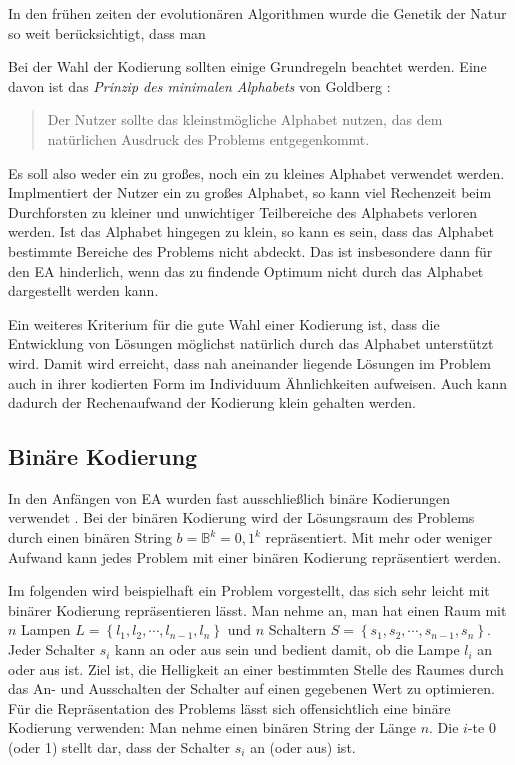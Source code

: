 In den frühen zeiten der evolutionären Algorithmen wurde die Genetik der Natur so weit berücksichtigt, dass man

Bei der Wahl der Kodierung sollten einige Grundregeln beachtet werden. Eine davon ist das \textit{Prinzip des minimalen Alphabets} von Goldberg \cite{Golderg:1}: 

\begin{quote}
Der Nutzer sollte das kleinstmögliche Alphabet nutzen, das dem natürlichen Ausdruck des Problems entgegenkommt.
\end{quote}

Es soll also weder ein zu großes, noch ein zu kleines Alphabet verwendet werden. Implmentiert der Nutzer ein zu großes Alphabet, so kann viel Rechenzeit beim Durchforsten zu kleiner und unwichtiger Teilbereiche des Alphabets verloren werden. Ist das Alphabet hingegen zu klein, so kann es sein, dass das Alphabet bestimmte Bereiche des Problems nicht abdeckt. Das ist insbesondere dann für den EA hinderlich, wenn das zu findende Optimum nicht durch das Alphabet dargestellt werden kann. 

Ein weiteres Kriterium für die gute Wahl einer Kodierung ist, dass die Entwicklung von Lösungen möglichst natürlich durch das Alphabet unterstützt wird. Damit wird erreicht, dass nah aneinander liegende Lösungen im Problem auch in ihrer kodierten Form im Individuum Ähnlichkeiten aufweisen. Auch kann dadurch der Rechenaufwand der Kodierung klein gehalten werden. 

\subsection{Binäre Kodierung}
\label{subsec:binary_coding}
In den Anfängen von EA wurden fast ausschließlich binäre Kodierungen verwendet \cite{Gerdes:1}. 
Bei der binären Kodierung wird der Lösungsraum des Problems durch einen binären String $b = \mathbb{B}^k = {0, 1}^k$ repräsentiert. Mit mehr oder weniger Aufwand kann jedes Problem mit einer binären Kodierung repräsentiert werden. 

Im folgenden wird beispielhaft ein Problem vorgestellt, das sich sehr leicht mit binärer Kodierung repräsentieren lässt. Man nehme an, man hat einen Raum mit $n$ Lampen $L = \left\{l_1, l_2, \cdots , l_{n-1}, l_n\right\}$ und $n$ Schaltern $S = \left\{s_1, s_2, \cdots , s_{n-1}, s_n\right\}$. Jeder Schalter $s_i$ kann an oder aus sein und bedient damit, ob die Lampe $l_i$ an oder aus ist. Ziel ist, die Helligkeit an einer bestimmten Stelle des Raumes durch das An- und Ausschalten der Schalter auf einen gegebenen Wert zu optimieren. Für die Repräsentation des Problems lässt sich offensichtlich eine binäre Kodierung verwenden: Man nehme einen binären String der Länge $n$. Die $i$-te 0 (oder 1) stellt dar, dass der Schalter $s_i$ an (oder aus) ist. 

